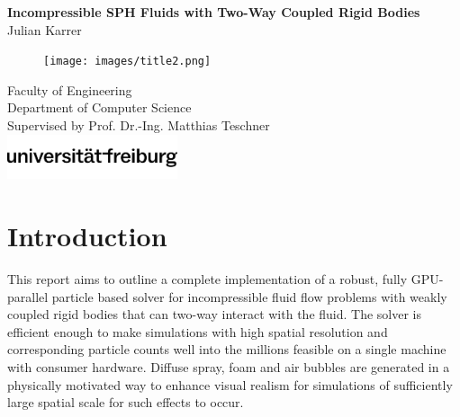 \documentclass[oneside, a4paper]{book}
\begin{document}
\begin{titlepage}
  \pagestyle{empty}

  \begin{center}
    \Huge\textbf{Incompressible SPH Fluids with Two-Way Coupled Rigid Bodies}\\
    \vspace{0.5cm}
    \Large{Julian Karrer}\\
    \vfill
    \Large
    \begin{figure}[H]
        \centering
        \texttt{[image: images/title2.png]}
    \end{figure}
    \vfill
    \large
    Faculty of Engineering\\
    Department of Computer Science\\
    Supervised by Prof. Dr.-Ing. Matthias Teschner\\
    \vspace{0.5cm}
    \includegraphics*[width=5cm]{images/ufr-logo.png}
  \end{center}
\end{titlepage}

\tableofcontents
\newpage

\chapter{Introduction}
This report aims to outline a complete implementation of a robust, fully GPU-parallel particle based solver for incompressible fluid flow problems with weakly coupled rigid bodies that can two-way interact with the fluid. The solver is efficient enough to make simulations with high spatial resolution and corresponding particle counts well into the millions feasible on a single machine with consumer hardware. Diffuse spray, foam and air bubbles are generated in a physically motivated way to enhance visual realism for simulations of sufficiently large spatial scale for such effects to occur. \\
\end{document}
